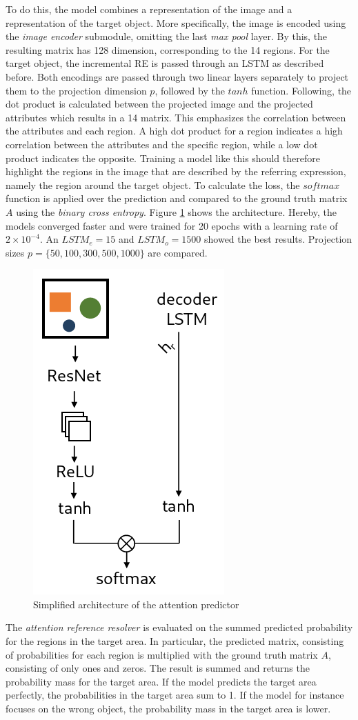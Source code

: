 To do this, the model combines a representation of the image and a representation of the target object.
More specifically, the image is encoded using the \emph{image encoder} submodule, omitting the last \emph{max pool} layer.
By this, the resulting matrix has 128 dimension, corresponding to the 14 regions.
For the target object, the incremental RE is passed through an LSTM as described before.
Both encodings are passed through two linear layers separately to project them to the projection dimension $p$, followed by the $tanh$ function.
Following, the dot product is calculated between the projected image and the projected attributes which results in a 14 matrix.
This emphasizes the correlation between the attributes and each region.
A high dot product for a region indicates a high correlation between the attributes and the specific region, while a low dot product indicates the opposite.
Training a model like this should therefore highlight the regions in the image that are described by the referring expression, namely the region around the target object.
To calculate the loss, the $softmax$ function is applied over the prediction and compared to the ground truth matrix $A$ using the \emph{binary cross entropy}.
Figure \ref{fig:attention_predictor_architecture} shows the architecture.
Hereby, the models converged faster and were trained for 20 epochs with a learning rate of $2\times10^{-4}$.
An $LSTM_e=15$ and $LSTM_o=1500$ showed the best results.
Projection sizes $p=\{50,100,300,500,1000\}$ are compared.

\begin{figure}[ht]
    \centering
    \includegraphics[width=.25\linewidth]{figures/arch_attention_predictor.png}
    \caption{Simplified architecture of the attention predictor}
    \label{fig:attention_predictor_architecture}
\end{figure}

The \emph{attention reference resolver} is evaluated on the summed predicted probability for the regions in the target area.
In particular, the predicted matrix, consisting of probabilities for each region is multiplied with the ground truth matrix $A$, consisting of only ones and zeros.
The result is summed and returns the probability mass for the target area.
If the model predicts the target area perfectly, the probabilities in the target area sum to 1.
If the model for instance focuses on the wrong object, the probability mass in the target area is lower.

